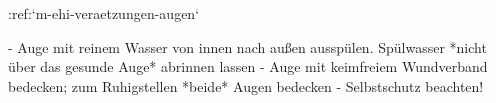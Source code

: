 :ref:`m-ehi-veraetzungen-augen`
\begin{itemize}
    -   Auge mit reinem Wasser von innen nach außen ausspülen.
    Spülwasser *nicht über das gesunde Auge* abrinnen lassen
    -   Auge mit keimfreiem Wundverband bedecken; zum Ruhigstellen *beide*
    Augen bedecken
    -   Selbstschutz beachten!
\end{itemize}